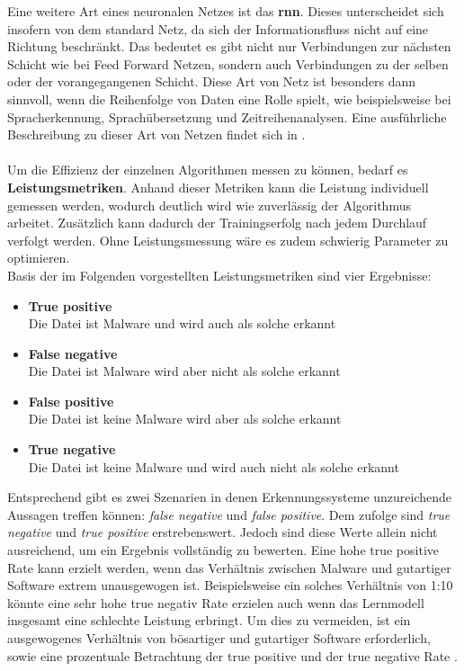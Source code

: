 \documentclass[
    12pt, %
    DIV10,
    ngerman, %
    a4paper, %
    oneside, %
    titlepage, %
    parskip=half, %
    headings=normal, %
    listof=totoc, %
    bibliography=totoc, %
    index=totoc, %
    captions=tableheading, %
    final %
]{scrreprt}
\begin{document}
Eine weitere Art eines neuronalen Netzes ist das \textbf{\ac{rnn}}. Dieses unterscheidet sich insofern von dem standard Netz, da sich der Informationsfluss nicht auf eine Richtung beschränkt. Das bedeutet es gibt nicht nur Verbindungen zur nächsten Schicht wie bei Feed Forward Netzen, sondern auch Verbindungen zu der selben oder der vorangegangenen Schicht. Diese Art von Netz ist besonders dann sinnvoll, wenn die Reihenfolge von Daten eine Rolle spielt, wie beispielsweise bei Spracherkennung, Sprachübersetzung und Zeitreihenanalysen. Eine ausführliche Beschreibung zu dieser Art von Netzen findet sich in \textcite{ravichandiran2018hands}.
\\\\
Um die Effizienz der einzelnen Algorithmen messen zu können, bedarf es \textbf{Leistungsmetriken}. Anhand dieser Metriken kann die Leistung individuell gemessen werden, wodurch deutlich wird wie zuverlässig der Algorithmus arbeitet. Zusätzlich kann dadurch der Trainingserfolg nach jedem Durchlauf verfolgt werden. Ohne Leistungsmessung wäre es zudem schwierig Parameter zu optimieren.\\
Basis der im Folgenden vorgestellten Leistungsmetriken sind vier Ergebnisse:
\begin{itemize}
\item \textbf{True positive}\\ Die Datei ist Malware und wird auch als solche erkannt
\item \textbf{False negative}\\ Die Datei ist Malware wird aber nicht als solche erkannt
\item \textbf{False positive}\\ Die Datei ist keine Malware wird aber als solche erkannt
\item \textbf{True negative}\\ Die Datei ist keine Malware und wird auch nicht als solche erkannt
\end{itemize}
Entsprechend gibt es zwei Szenarien in denen Erkennungssysteme unzureichende Aussagen treffen können: \emph{false negative} und \emph{false positive}. Dem zufolge sind \emph{true negative} und \emph{true positive} erstrebenswert. Jedoch sind diese Werte allein nicht ausreichend, um ein Ergebnis vollständig zu bewerten. Eine hohe true positive Rate kann erzielt werden, wenn das Verhältnis zwischen Malware und gutartiger Software extrem unausgewogen ist. Beispielsweise ein solches Verhältnis von 1:10 könnte eine sehr hohe true negativ Rate erzielen auch wenn das Lernmodell insgesamt eine schlechte Leistung erbringt. Um dies zu vermeiden, ist ein ausgewogenes Verhältnis von bösartiger und gutartiger Software erforderlich, sowie eine prozentuale Betrachtung der true positive und der true negative Rate \parencite{Aldwairi2018}.\\\\
\end{document}
